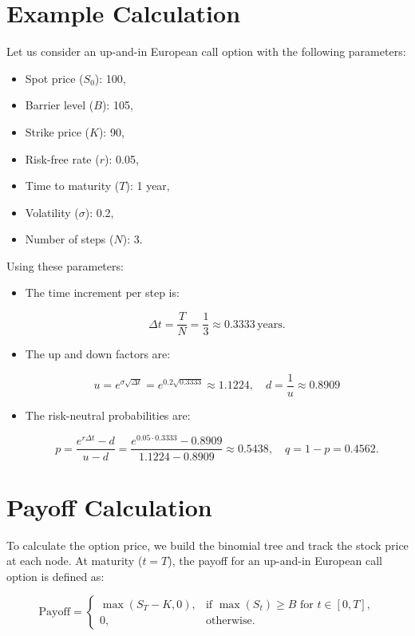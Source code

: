\section{Example Calculation}

Let us consider an up-and-in European call option with the following parameters:
\begin{itemize}
    \item Spot price (\(S_0\)): 100,
    \item Barrier level (\(B\)): 105,
    \item Strike price (\(K\)): 90,
    \item Risk-free rate (\(r\)): 0.05,
    \item Time to maturity (\(T\)): 1 year,
    \item Volatility (\(\sigma\)): 0.2,
    \item Number of steps (\(N\)): 3.
\end{itemize}

Using these parameters:
\begin{itemize}
    \item The time increment per step is:
    

\[
    \Delta t = \frac{T}{N} = \frac{1}{3} \approx 0.3333 \, \text{years}.
    \]


    \item The up and down factors are:
    

\[
    u = e^{\sigma \sqrt{\Delta t}} = e^{0.2 \sqrt{0.3333}} \approx 1.1224, \quad d = \frac{1}{u} \approx 0.8909
    \]


    \item The risk-neutral probabilities are:
    

\[
    p = \frac{e^{r \Delta t} - d}{u - d} = \frac{e^{0.05 \cdot 0.3333} - 0.8909}{1.1224 - 0.8909} \approx 0.5438, \quad q = 1 - p = 0.4562.
    \]


\end{itemize}

\section{Payoff Calculation}

To calculate the option price, we build the binomial tree and track the stock price at each node. At maturity (\(t = T\)), the payoff for an up-and-in European call option is defined as:

\begin{equation}
\text{Payoff} =
\begin{cases} 
\max(S_T - K, 0), & \text{if } \max(S_t) \geq B \text{ for } t \in [0, T], \\
0, & \text{otherwise.}
\end{cases}
\end{equation}

